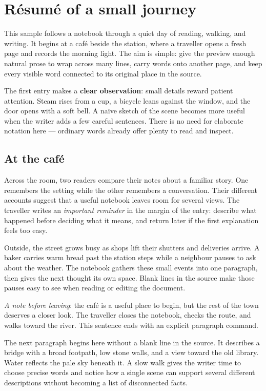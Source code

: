 
\section{Résumé of a small journey}
This sample follows a notebook through a quiet day of reading, walking, and writing. It begins at a café beside the station, where a traveller opens a fresh page and records the morning light. The aim is simple: give the preview enough natural prose to wrap across many lines, carry words onto another page, and keep every visible word connected to its original place in the source.

The first entry makes a \textbf{clear observation}: small details reward patient attention. Steam rises from a cup, a bicycle leans against the window, and the door opens with a soft bell. A naïve sketch of the scene becomes more useful when the writer adds a few careful sentences. There is no need for elaborate notation here — ordinary words already offer plenty to read and inspect.

\subsection{At the café}
Across the room, two readers compare their notes about a familiar story. One remembers the setting while the other remembers a conversation. Their different accounts suggest that a useful notebook leaves room for several views. The traveller writes an \emph{important reminder} in the margin of the entry: describe what happened before deciding what it means, and return later if the first explanation feels too easy.

Outside, the street grows busy as shops lift their shutters and deliveries arrive. A baker carries warm bread past the station steps while a neighbour pauses to ask about the weather. The notebook gathers these small events into one paragraph, then gives the next thought its own space. Blank lines in the source make those pauses easy to see when reading or editing the document.

\textit{A note before leaving}: the café is a useful place to begin, but the rest of the town deserves a closer look. The traveller closes the notebook, checks the route, and walks toward the river. This sentence ends with an explicit paragraph command.\par
The next paragraph begins here without a blank line in the source. It describes a bridge with a broad footpath, low stone walls, and a view toward the old library. Water reflects the pale sky beneath it. A slow walk gives the writer time to choose precise words and notice how a single scene can support several different descriptions without becoming a list of disconnected facts.

